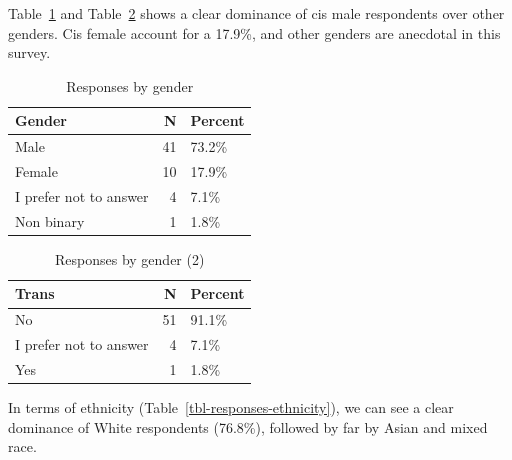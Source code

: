 \documentclass[
  a4paper,
]{book}
\begin{document}
Table~\ref{tbl-responses-gender} and
Table~\ref{tbl-responses-transgender} shows a clear dominance of cis
male respondents over other genders. Cis female account for a 17.9\%,
and other genders are anecdotal in this survey.

\begin{longtable}[]{@{}lrl@{}}

\caption{\label{tbl-responses-gender}Responses by gender}

\tabularnewline

\toprule\noalign{}
Gender & N & Percent \\
\midrule\noalign{}
\endhead
\bottomrule\noalign{}
\endlastfoot
Male & 41 & 73.2\% \\
Female & 10 & 17.9\% \\
I prefer not to answer & 4 & 7.1\% \\
Non binary & 1 & 1.8\% \\

\end{longtable}

\begin{longtable}[]{@{}lrl@{}}

\caption{\label{tbl-responses-transgender}Responses by gender (2)}

\tabularnewline

\toprule\noalign{}
Trans & N & Percent \\
\midrule\noalign{}
\endhead
\bottomrule\noalign{}
\endlastfoot
No & 51 & 91.1\% \\
I prefer not to answer & 4 & 7.1\% \\
Yes & 1 & 1.8\% \\

\end{longtable}

In terms of ethnicity (Table~\ref{tbl-responses-ethnicity}), we can see
a clear dominance of White respondents (76.8\%), followed by far by
Asian and mixed race.
\end{document}
